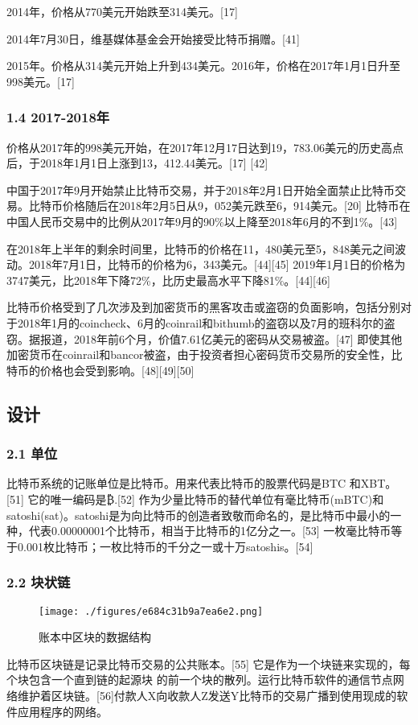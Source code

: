 2014年，价格从770美元开始跌至314美元。[17]

2014年7月30日，维基媒体基金会开始接受比特币捐赠。[41]

2015年。价格从314美元开始上升到434美元。2016年，价格在2017年1月1日升至998美元。[17]
\subsubsection{1.4 2017-2018年}
价格从2017年的998美元开始，在2017年12月17日达到19，783.06美元的历史高点后，于2018年1月1日上涨到13，412.44美元。[17] [42]

中国于2017年9月开始禁止比特币交易，并于2018年2月1日开始全面禁止比特币交易。比特币价格随后在2018年2月5日从9，052美元跌至6，914美元。[20] 比特币在中国人民币交易中的比例从2017年9月的90\%以上降至2018年6月的不到1\%。[43]

在2018年上半年的剩余时间里，比特币的价格在11，480美元至5，848美元之间波动。2018年7月1日，比特币的价格为6，343美元。[44][45] 2019年1月1日的价格为3747美元，比2018年下降72\%，比历史最高水平下降81\%。[44][46]

比特币价格受到了几次涉及到加密货币的黑客攻击或盗窃的负面影响，包括分别对于2018年1月的coincheck、6月的coinrail和bithumb的盗窃以及7月的班科尔的盗窃。据报道，2018年前6个月，价值7.61亿美元的密码从交易被盗。[47] 即使其他加密货币在coinrail和bancor被盗，由于投资者担心密码货币交易所的安全性，比特币的价格也会受到影响。[48][49][50]

\subsection{设计}
\subsubsection{2.1 单位}
比特币系统的记账单位是比特币。用来代表比特币的股票代码是BTC 和XBT。[51] 它的唯一编码是₿.[52] 作为少量比特币的替代单位有毫比特币(mBTC)和satoshi(sat)。satoshi是为向比特币的创造者致敬而命名的，是比特币中最小的一种，代表0.00000001个比特币，相当于比特币的1亿分之一。[53] 一枚毫比特币等于0.001枚比特币；一枚比特币的千分之一或十万satoshis。[54]
\subsubsection{2.2 块状链}
\begin{figure}[ht]
\centering
\texttt{[image: ./figures/e684c31b9a7ea6e2.png]}
\caption{账本中区块的数据结构} \label{fig_BTC_1}
\end{figure}
比特币区块链是记录比特币交易的公共账本。[55] 它是作为一个块链来实现的，每个块包含一个直到链的起源块 的前一个块的散列。运行比特币软件的通信节点网络维护着区块链。[56]付款人X向收款人Z发送Y比特币的交易广播到使用现成的软件应用程序的网络。

